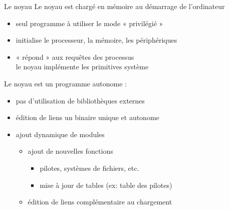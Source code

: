\begin {frame} {Le noyau}
    Le noyau est chargé en mémoire au démarrage de l'ordinateur
    \begin {itemize}
	\item seul programme à utiliser le mode « privilégié »
	\item initialise le processeur, la mémoire, les périphériques
	\item « répond » aux requêtes des processus \\
	    \implique le noyau implémente les primitives système
    \end {itemize}

    \vspace* {3mm}
    Le noyau est un programme autonome :
    \begin {itemize}
	\item pas d'utilisation de bibliothèques externes
	\item édition de liens \implique un binaire unique et autonome
	\item ajout dynamique de modules
	    \begin {itemize}
		\item ajout de nouvelles fonctions
		    \begin {itemize}
			\item pilotes, systèmes de fichiers, etc.
			\item mise à jour de tables (ex: table des pilotes)
		    \end {itemize}
		\item édition de liens complémentaire au chargement
	    \end {itemize}
    \end {itemize}
\end {frame}

